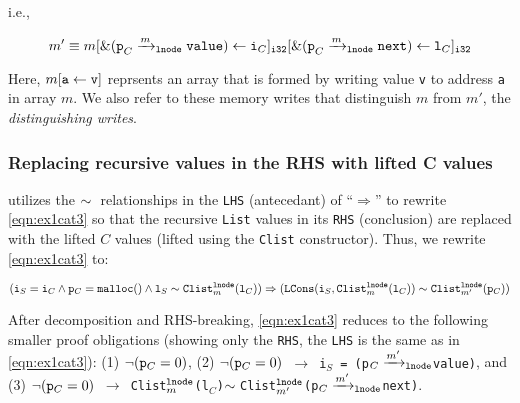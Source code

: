 i.e.,
\vspace{-5px}
\begin{small}
\begin{equation}\label{eqn:memstore}
m' \equiv m[{\tt \&(p}_C\xrightarrow[]{m}_{\mathrm{\tt lnode}}{\tt value}) \leftarrow {\tt i}_C]_{\tt i32}[{\tt \&(p}_C\xrightarrow[]{m}_{\mathrm{\tt lnode}}{\tt next}) \leftarrow {\tt l}_C]_{\tt i32}
\end{equation}
\end{small}
Here, $m[{\tt a}\leftarrow{\tt v}]$ reprsents an array that is
formed by writing value {\tt v} to address {\tt a} in array $m$.
We also refer to
these memory writes that distinguish $m$ from $m'$, the {\em distinguishing writes}.

\subsubsection{Replacing \SpecL{} recursive values in the RHS with lifted C values}
\toolName{} utilizes
the $\sim{}$ relationships in the {\tt LHS} (antecedant) of ``$\Rightarrow$''
to rewrite \cref{eqn:ex1cat3}
so that the recursive {\tt List} values in its {\tt RHS} (conclusion)
are replaced with the lifted $C$ values (lifted using
the {\tt Clist} constructor). Thus, we
rewrite \cref{eqn:ex1cat3} to:
\vspace{-5px}
\begin{small}
\begin{equation}\label{eqn:ex2cat3}
({\tt i}_S={\tt i}_C \land {\tt p}_C={\tt malloc()} \land {\tt l}_S \sim{} {\tt Clist}_m^{{\tt lnode}}({\tt l}_C)) \Rightarrow ({\tt LCons}({\tt i}_S, {\tt Clist}_m^{{\tt lnode}}({\tt l}_C)) \sim{} {\tt Clist}_{m'}^{{\tt lnode}}({\tt p}_C))
\end{equation}
\end{small}
After decomposition and RHS-breaking, \cref{eqn:ex1cat3}
reduces to the following smaller proof obligations (showing only the
{\tt RHS}, the {\tt LHS} is the same as in \cref{eqn:ex1cat3}):
(1) $\neg({\tt p}_C=0)$,
(2) {\tt $\neg({\tt p}_C=0)$ $\rightarrow$ i$_S$\ =\ (p$_C\xrightarrow[]{m'}_{\mathrm{\tt lnode}}$value)}, and
(3) {\tt $\neg({\tt p}_C=0)$ $\rightarrow$ Clist$_{m}^{{\tt lnode}}$(l$_C$)$\sim{}$Clist$_{m'}^{{\tt lnode}}$(p$_C\xrightarrow[]{m'}_{\mathrm{\tt lnode}}$next)}.
